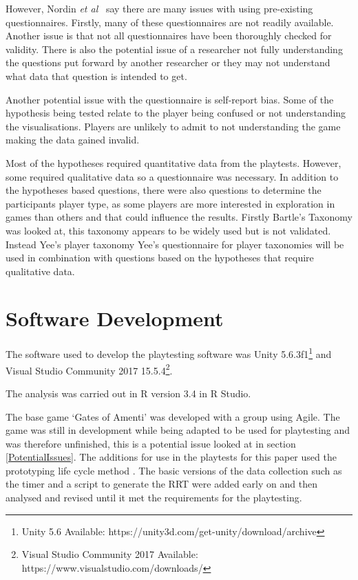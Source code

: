 \documentclass[journal]{IEEEtran}
\begin{document}
	However, Nordin \textit{et al}~\cite{nordin2014} say there are many issues with using pre-existing questionnaires. Firstly, many of these questionnaires are not readily available. Another issue is that not all questionnaires have been thoroughly checked for validity. There is also the potential issue of a researcher not fully understanding the questions put forward by another researcher or they may not understand what data that question is intended to get.
	
	Another potential issue with the questionnaire is self-report bias. Some of the hypothesis being tested relate to the player being confused or not understanding the visualisations. Players are unlikely to admit to not understanding the game making the data gained invalid. 
	
	Most of the hypotheses required quantitative data from the playtests. However, some required qualitative data so a questionnaire was necessary.  In addition to the hypotheses based questions, there were also questions to determine the participants player type, as some players are more interested in exploration in games than others and that could influence the results. 
	Firstly Bartle's Taxonomy \cite{Bartle1996} was looked at, this taxonomy appears to be widely used but is not validated. Instead Yee's player taxonomy 
	Yee's questionnaire for player taxonomies will be used in combination with questions based on the hypotheses that require qualitative data. 
	
	\section{Software Development} \label{softdev}
	The software used to develop the playtesting software was Unity 5.6.3f1\footnote[3]{Unity 5.6 Available: https://unity3d.com/get-unity/download/archive} and Visual Studio Community 2017  15.5.4\footnote[4]{Visual Studio Community 2017 Available: https://www.visualstudio.com/downloads/}.
	
	The analysis was carried out in R version 3.4 in R Studio.
	
	The base game `Gates of Amenti' was developed with a group using Agile. The game was still in development while being adapted to be used for playtesting and was therefore unfinished, this is a potential issue looked at in section \ref{PotentialIssues}. The additions for use in the playtests for this paper used the prototyping life cycle method \cite{isaias2015}. The basic versions of the data collection such as the timer and a script to generate the RRT were added early on and then analysed and revised until it met the requirements for the playtesting. 
	
\end{document}
